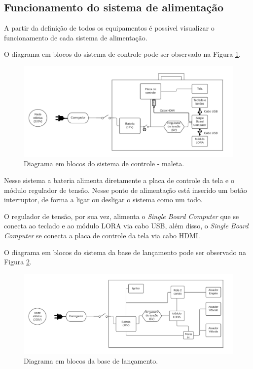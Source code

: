 \subsection{Funcionamento do sistema de alimentação}

A partir da definição de todos os equipamentos é possível visualizar o funcionamento de cada sistema de alimentação.  

O diagrama em blocos do sistema de controle pode ser observado na Figura \ref{fig:blocosmaleta}.

\begin{figure}[!h]
	\centering
		\includegraphics[keepaspectratio=true,scale=0.6]{figuras/blocos_maleta.jpeg}
	\caption{Diagrama em blocos do sistema de controle - maleta.}
	\label{fig:blocosmaleta}
\end{figure}

Nesse sistema a bateria alimenta diretamente a placa de controle da tela e o módulo regulador de tensão. Nesse ponto de alimentação está inserido um botão interruptor, de forma a ligar ou desligar o sistema como um todo.

O regulador de tensão, por sua vez, alimenta o \textit{Single Board Computer} que se conecta ao teclado e ao módulo LORA via cabo USB, além disso, o \textit{Single Board Computer} se conecta a placa de controle da tela via cabo HDMI. 

O diagrama em blocos do sistema da base de lançamento pode ser observado na Figura \ref{fig:blocos_base}.

\begin{figure}[!h]
	\centering
		\includegraphics[keepaspectratio=true,scale=0.6]{figuras/blocos_base.jpeg}
	\caption{Diagrama em blocos da base de lançamento.}
	\label{fig:blocos_base}
\end{figure}

